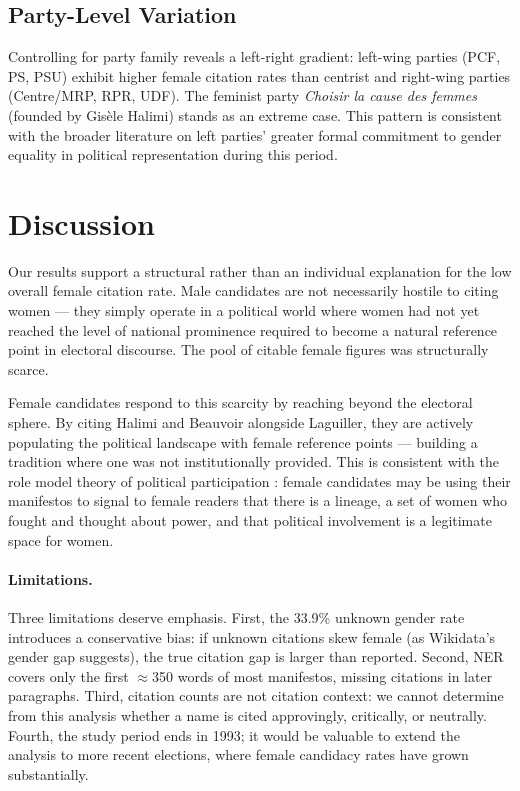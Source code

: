 \documentclass{article}
\begin{document}
\subsection{Party-Level Variation}

Controlling for party family reveals a left-right gradient: left-wing parties
(PCF, PS, PSU) exhibit higher female citation rates than centrist and right-wing
parties (Centre/MRP, RPR, UDF). The feminist party \emph{Choisir la cause des
femmes} (founded by Gisèle Halimi) stands as an extreme case. This pattern is
consistent with the broader literature on left parties' greater formal commitment
to gender equality in political representation during this period.


\section{Discussion}

Our results support a structural rather than an individual explanation for the
low overall female citation rate. Male candidates are not necessarily hostile to
citing women — they simply operate in a political world where women had not yet
reached the level of national prominence required to become a natural reference
point in electoral discourse. The pool of citable female figures was structurally
scarce.

Female candidates respond to this scarcity by reaching beyond the electoral
sphere. By citing Halimi and Beauvoir alongside Laguiller, they are actively
populating the political landscape with female reference points — building a
tradition where one was not institutionally provided. This is consistent with the
role model theory of political participation \cite{campbell2010}: female
candidates may be using their manifestos to signal to female readers that there
is a lineage, a set of women who fought and thought about power, and that
political involvement is a legitimate space for women.

\paragraph{Limitations.}
Three limitations deserve emphasis. First, the 33.9\% unknown gender rate
introduces a conservative bias: if unknown citations skew female (as
Wikidata's gender gap suggests), the true citation gap is larger than reported.
Second, NER covers only the first $\approx$350 words of most manifestos, missing
citations in later paragraphs. Third, citation counts are not citation context:
we cannot determine from this analysis whether a name is cited approvingly,
critically, or neutrally. Fourth, the study period ends in 1993; it would be
valuable to extend the analysis to more recent elections, where female candidacy
rates have grown substantially.
\end{document}
